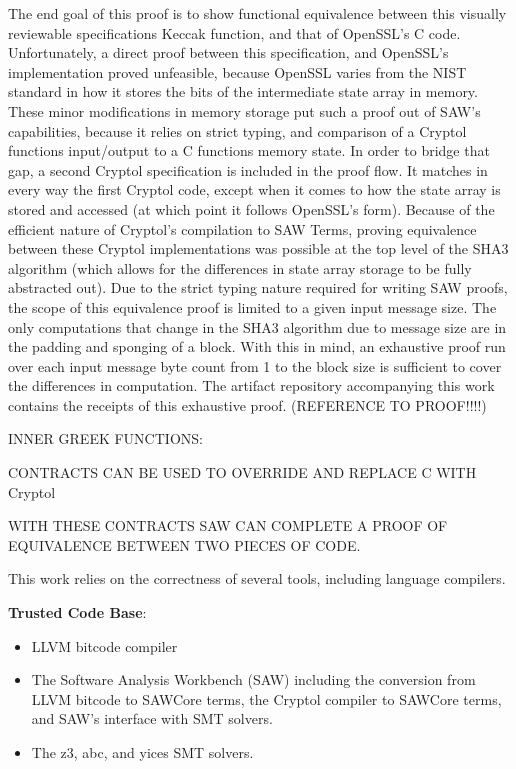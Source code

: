 The end goal of this proof is to show functional equivalence between this visually reviewable specifications Keccak function, and that of OpenSSL's C code.
Unfortunately, a direct proof between this specification, and OpenSSL's implementation proved unfeasible, because OpenSSL varies from the NIST standard in how it stores the bits of the intermediate state array in memory.
These minor modifications in memory storage put such a proof out of SAW's capabilities, because it relies on strict typing, and comparison of a Cryptol functions input/output to a C functions memory state.
In order to bridge that gap, a second Cryptol specification is included in the proof flow.
It matches in every way the first Cryptol code, except when it comes to how the state array is stored and accessed (at which point it follows OpenSSL's form).
Because of the efficient nature of Cryptol's compilation to SAW Terms, proving equivalence between these Cryptol implementations was possible at the top level of the SHA3 algorithm (which allows for the differences in state array storage to be fully abstracted out).
Due to the strict typing nature required for writing SAW proofs, the scope of this equivalence proof is limited to a given input message size.
The only computations that change in the SHA3 algorithm due to message size are in the padding and sponging of a block.
With this in mind, an exhaustive proof run over each input message byte count from 1 to the block size is sufficient to cover the differences in computation.
The artifact repository accompanying this work contains the receipts of this exhaustive proof. (REFERENCE TO PROOF!!!!)

INNER GREEK FUNCTIONS:

CONTRACTS CAN BE USED TO OVERRIDE AND REPLACE C WITH Cryptol

WITH THESE CONTRACTS SAW CAN COMPLETE A PROOF OF EQUIVALENCE BETWEEN TWO PIECES OF CODE.

This work relies on the correctness of several tools, including language compilers. 

\noindent \textbf{Trusted Code Base}:
\begin{itemize}
  \item LLVM bitcode compiler
  \item The Software Analysis Workbench (SAW) including the conversion from LLVM bitcode to SAWCore terms, the Cryptol compiler to SAWCore terms, and SAW's interface with SMT solvers.
  \item The z3, abc, and yices SMT solvers.
\end{itemize}
